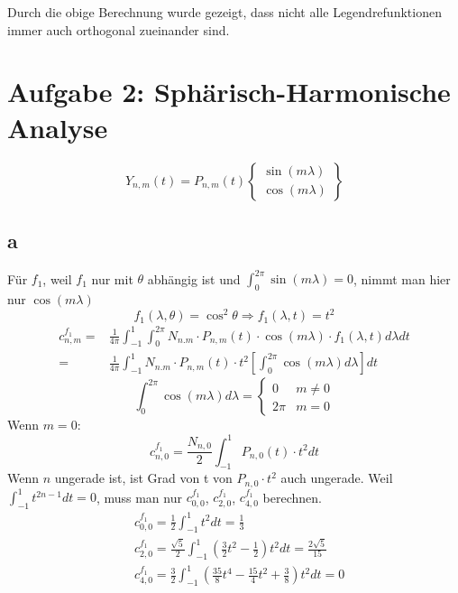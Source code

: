 Durch die obige Berechnung wurde gezeigt, dass nicht alle Legendrefunktionen immer auch orthogonal zueinander sind. 


\clearpage
\section{Aufgabe 2: Sphärisch-Harmonische Analyse}
\begin{equation}
	Y_{n,m}(t) = P_{n,m}(t) \begin{Bmatrix}
	\sin(m\lambda) \\
	\cos(m \lambda)
	\end{Bmatrix}
\end{equation}
\subsection{a}
Für $f_1$, weil $f_1$ nur mit $\theta$ abhängig ist und $\int_{0}^{2\pi}\sin(m\lambda) = 0$, nimmt man hier nur $\cos(m\lambda)$
\begin{equation}
	f_1(\lambda,\theta) = \cos^2\theta \Longrightarrow f_1(\lambda,t) = t^2 
\end{equation}
\begin{align}
	c_{n,m}^{f_1} = & \frac{1}{4\pi} \int_{-1}^{1} \int_{0}^{2\pi} N_{n.m} \cdot P_{n,m}(t) \cdot \cos(m\lambda) \cdot f_1(\lambda,t) d\lambda dt \\
	= & \frac{1}{4\pi} \int_{-1}^{1} N_{n.m} \cdot P_{n,m}(t) \cdot t^2  \left[\int_{0}^{2\pi} \cos(m\lambda) d\lambda\right]  dt
\end{align}
\begin{equation}
	\int_{0}^{2\pi} \cos(m\lambda) d\lambda = \begin{cases}
	0 & m \neq 0 \\
	2\pi & m=0
	\end{cases}
\end{equation}
Wenn $m=0$:
\begin{equation}
	c_{n,0}^{f_1} = \frac{N_{n,0}}{2} \int_{-1}^{1} P_{n,0}(t) \cdot t^2 dt
\end{equation}
Wenn $n$ ungerade ist, ist Grad von t von $P_{n,0}\cdot t^2$ auch ungerade. Weil $\int_{-1}^{1} t^{2n-1}dt = 0$, muss man nur $c_{0,0}^{f_1}$, $c_{2,0}^{f_1}$, $c_{4,0}^{f_1}$ berechnen.
\begin{align}
	& c_{0,0}^{f_1} = \frac{1}{2} \int_{-1}^{1} t^2 dt = \frac{1}{3} \\
	& c_{2,0}^{f_1} = \frac{\sqrt{5}}{2} \int_{-1}^{1} (\frac{3}{2}t^2-\frac{1}{2})t^2dt = \frac{2\sqrt{5}}{15} \\
	& c_{4,0}^{f_1} = \frac{3}{2} \int_{-1}^{1} (\frac{35}{8}t^4 - \frac{15}{4}t^2 + \frac{3}{8})t^2dt = 0
\end{align}
